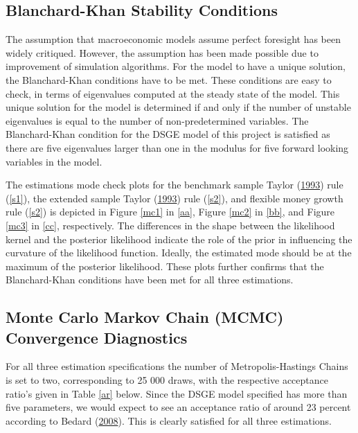 \documentclass[11pt,preprint, authoryear]{elsarticle}
\numberwithin{equation}{section}
\numberwithin{figure}{section}
\numberwithin{table}{section}
\begin{document}
\hypertarget{blanchard-khan-stability-conditions}{%
\subsection{Blanchard-Khan Stability
Conditions}\label{blanchard-khan-stability-conditions}}

The assumption that macroeconomic models assume perfect foresight has
been widely critiqued. However, the assumption has been made possible
due to improvement of simulation algorithms. For the model to have a
unique solution, the Blanchard-Khan conditions have to be met. These
conditions are easy to check, in terms of eigenvalues computed at the
steady state of the model. This unique solution for the model is
determined if and only if the number of unstable eigenvalues is equal to
the number of non-predetermined variables. The Blanchard-Khan condition
for the DSGE model of this project is satisfied as there are five
eigenvalues larger than one in the modulus for five forward looking
variables in the model.

The estimations mode check plots for the benchmark sample Taylor
(\protect\hyperlink{ref-taylor1993}{1993}) rule (\ref{s1}), the extended
sample Taylor (\protect\hyperlink{ref-taylor1993}{1993}) rule
(\ref{s2}), and flexible money growth rule (\ref{s2}) is depicted in
Figure \ref{mc1} in \ref{aa}, Figure \ref{mc2} in \ref{bb}, and Figure
\ref{mc3} in \ref{cc}, respectively. The differences in the shape
between the likelihood kernel and the posterior likelihood indicate the
role of the prior in influencing the curvature of the likelihood
function. Ideally, the estimated mode should be at the maximum of the
posterior likelihood. These plots further confirms that the
Blanchard-Khan conditions have been met for all three estimations.

\hypertarget{monte-carlo-markov-chain-mcmc-convergence-diagnostics}{%
\subsection{Monte Carlo Markov Chain (MCMC) Convergence
Diagnostics}\label{monte-carlo-markov-chain-mcmc-convergence-diagnostics}}

For all three estimation specifications the number of
Metropolis-Hastings Chains is set to two, corresponding to 25 000 draws,
with the respective acceptance ratio's given in Table \ref{ar} below.
Since the DSGE model specified has more than five parameters, we would
expect to see an acceptance ratio of around 23 percent according to
Bedard (\protect\hyperlink{ref-bedard2008optimal}{2008}). This is
clearly satisfied for all three estimations.
\end{document}
